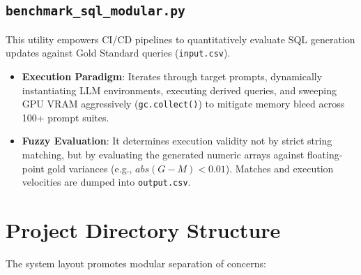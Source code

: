 \documentclass[12pt,a4paper]{article}
\begin{document}
\subsection{\texttt{benchmark\_sql\_modular.py}}
This utility empowers CI/CD pipelines to quantitatively evaluate SQL generation updates against Gold Standard queries (\texttt{input.csv}).
\begin{itemize}[label=\textcolor{primary}{\textbullet}]
    \item \textbf{Execution Paradigm}: Iterates through target prompts, dynamically instantiating LLM environments, executing derived queries, and sweeping GPU VRAM aggressively (\texttt{gc.collect()}) to mitigate memory bleed across 100+ prompt suites.
    \item \textbf{Fuzzy Evaluation}: It determines execution validity not by strict string matching, but by evaluating the generated numeric arrays against floating-point gold variances (e.g., $abs(G - M) < 0.01$). Matches and execution velocities are dumped into \texttt{output.csv}.
\end{itemize}

\section{Project Directory Structure}
The system layout promotes modular separation of concerns:
\end{document}

